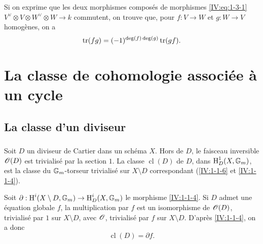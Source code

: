 Si on exprime que les deux morphismes compos\'es de morphismes 
\eqref{IV:eq:1-3-1} $V^\vee\otimes V\otimes W^\vee\otimes W\to k$ commutent, on 
trouve que, pour $f:V\to W$ et $g:W\to V$ homog\`enes, on a 
\begin{equation}\label{IV:eq:1-3-6}
  \operatorname{tr}(f g) = (-1)^{\deg(f)\deg(g)} \operatorname{tr}(g f) \text{.}
\end{equation}




















\section{La classe de cohomologie associ\'ee \`a un cycle}\label{IV:2}










\subsection{La classe d'un diviseur}\label{IV:2-1}





\subsubsection{}\label{IV:2-1-1}

Soit $D$ un diviseur de Cartier dans un sch\'ema $X$. Hors de $D$, le faisceau 
inversible $\mathscr{O}(D)$ est trivialis\'e par la section $1$. La classe 
$\operatorname{cl}(D)$ de $D$, dans $\operatorname{H}_D^1(X,\mathbb{G}_m)$, est la classe du 
$\mathbb{G}_m$-torseur trivialis\'e sur $X\setminus D$ correspondant 
(\ref{IV:1-1-6} et \ref{IV:1-1-4}). 

Soit $\partial:\operatorname{H}^i(X\setminus D,\mathbb{G}_m)\to \operatorname{H}_D^i(X,\mathbb{G}_m)$ le morphisme 
\ref{IV:1-1-4}. Si $D$ admet une équation globale $f$, la multiplication par 
$f$ est un isomorphisme de $\mathscr{O}(D)$, trivialis\'e par $1$ sur $X\setminus D$, 
avec $\mathscr{O}$, trivialis\'e par $f$ sur $X\setminus D$. D'apr\`es \ref{IV:1-1-4}, 
on a donc 
\begin{equation}\label{IV:2-1-1-1}
  \operatorname{cl}(D) = \partial f \text{.}
\end{equation}

